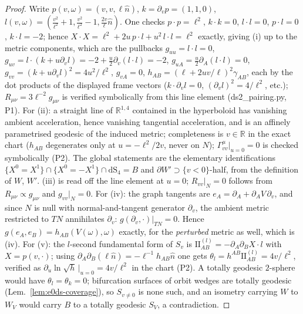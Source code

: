 \begin{proof}
Write $p(v,\omega)=(v,v,\ell\hat n)$, $k=\partial_{v}p=(1,1,0)$,
$l(v,\omega)=(\tfrac{v^{2}}{\ell^{2}}+1,\tfrac{v^{2}}{\ell^{2}}-1,
\tfrac{2v}{\ell}\hat n)$. One checks $p\cdot p=\ell^{2}$, $k\cdot k=0$,
$l\cdot l=0$, $p\cdot l=0$, $k\cdot l=-2$; hence $X\cdot X=\ell^{2}+
2u\,p\cdot l+u^{2}\,l\cdot l=\ell^{2}$ exactly, giving (i) up to the
metric components, which are the pullbacks $g_{uu}=l\cdot l=0$,
$g_{uv}=l\cdot(k+u\partial_{v}l)=-2+\tfrac{u}{2}\partial_{v}(l\cdot
l)=-2$, $g_{uA}=\tfrac{u}{2}\partial_{A}(l\cdot l)=0$,
$g_{vv}=(k+u\partial_{v}l)^{2}=4u^{2}/\ell^{2}$,
$g_{vA}=0$, $h_{AB}=(\ell+2uv/\ell)^{2}\gamma_{AB}$, each by the dot
products of the displayed frame vectors ($k\cdot\partial_{v}l=0$,
$(\partial_{v}l)^{2}=4/\ell^{2}$, etc.); $R_{\mu\nu}=3\ell^{-2}
g_{\mu\nu}$ is verified symbolically from this line element
(ds2\_pairing.py, P1). For (ii): a straight line of $\mathbb{R}^{1,4}$
contained in the hyperboloid has vanishing ambient acceleration, hence
vanishing tangential acceleration, and is an affinely parametrised
geodesic of the induced metric; completeness is $v\in\mathbb{R}$ in
the exact chart ($h_{AB}$ degenerates only at $u=-\ell^{2}/2v$, never
on $N$); $\Gamma^{\mu}_{vv}|_{u=0}=0$ is checked symbolically (P2).
The global statements are the elementary identifications
$\{X^{0}=X^{1}\}\cap\{X^{0}=-X^{1}\}\cap\mathrm{dS}_{4}=B$ and
$\partial W'\supset\{v<0\}$-half, from the definition of $W$, $W'$.
(iii) is read off the line element at $u=0$; $R_{vv}|_{N}=0$ follows
from $R_{\mu\nu}\propto g_{\mu\nu}$ and $g_{vv}|_{N}=0$. For (iv): the
graph tangents are $e_{A}=\partial_{A}+\partial_{A}V\,\partial_{v}$,
and since $N$ is null with normal-and-tangent generator
$\partial_{v}$, the ambient metric restricted to $TN$ annihilates
$\partial_{v}$: $g(\partial_{v},\cdot)|_{TN}=0$. Hence
$g(e_{A},e_{B})=h_{AB}(V(\omega),\omega)$ exactly, for the
\emph{perturbed} metric as well, which is (iv). For (v): the
$l$-second fundamental form of $S_{v}$ is
$\mathrm{II}^{(l)}_{AB}=-\partial_{A}\partial_{B}X\cdot l$ with
$X=p(v,\cdot)$; using $\partial_{A}\partial_{B}(\ell\hat n)=
-\ell^{-1}h_{AB}\hat n$ one gets $\theta_{l}=h^{AB}\mathrm{II}^{(l)}
_{AB}=4v/\ell^{2}$, verified as $\partial_{u}\ln\sqrt{h}\,|_{u=0}
=4v/\ell^{2}$ in the chart (P2). A totally geodesic $2$-sphere would
have $\theta_{l}=\theta_{k}=0$; bifurcation surfaces of orbit wedges
are totally geodesic (Lem.~\ref{lem:e0ds-coverage}), so
$S_{v\neq0}$ is none such, and an isometry carrying $W$ to $W_{V}$
would carry $B$ to a totally geodesic $S_{V}$, a contradiction.
\end{proof}

